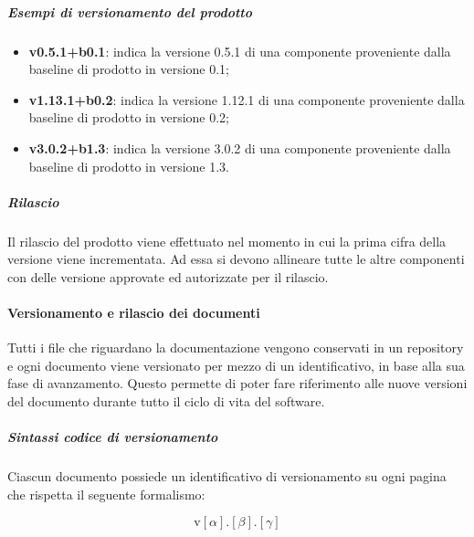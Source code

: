 		\subparagraph{Esempi di versionamento del prodotto}

		\begin{itemize}
			\item \textbf{v0.5.1+b0.1}: indica la versione 0.5.1 di una componente proveniente dalla baseline di prodotto in versione 0.1;
			\item \textbf{v1.13.1+b0.2}:  indica la versione 1.12.1 di una componente proveniente dalla baseline di prodotto in versione 0.2;
			\item \textbf{v3.0.2+b1.3}: indica la versione 3.0.2 di una componente proveniente dalla baseline di prodotto in versione 1.3.
		\end{itemize}

		\subparagraph{Rilascio}

		Il rilascio del prodotto viene effettuato nel momento in cui la prima cifra della versione viene incrementata. Ad essa si devono allineare tutte le altre componenti con delle versione approvate ed autorizzate per il rilascio. 

	\paragraph{Versionamento e rilascio dei documenti}

	Tutti i file che riguardano la documentazione vengono conservati in un repository e ogni documento viene versionato per mezzo di un identificativo, in base alla sua fase di avanzamento. Questo permette di poter fare riferimento alle nuove versioni del documento durante tutto il ciclo di vita del software.

		\subparagraph{Sintassi codice di versionamento}

		Ciascun documento possiede un identificativo di versionamento su ogni pagina che rispetta il seguente formalismo:

		\[%
			\text{v}[\alpha].[\beta].[\gamma]
		\]

